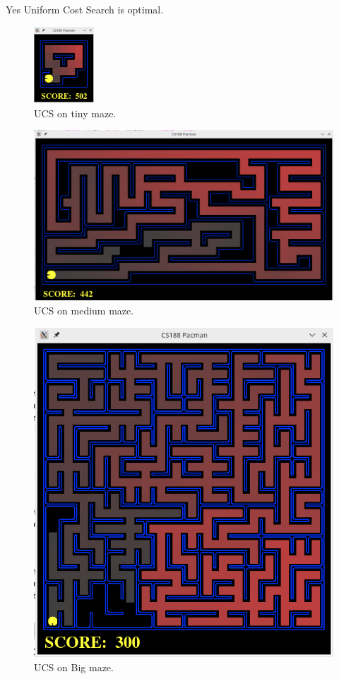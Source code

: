 \documentclass[
10pt, %
a4paper, %
oneside, %
headinclude,footinclude, %
BCOR5mm, %
]{scrartcl}
\begin{document}
\subsection*{}
Yes Uniform Cost Search is optimal.


\begin{figure}[h!]
	\centering
	\includegraphics[width=0.20\textwidth]{images/fig_7_tiny_maze_ucs.png}
	\caption{ UCS on tiny maze.}
	\label{fig:fig_7_tiny_maze_ucs}
\end{figure}

\begin{figure}[h!]
	\centering
	\includegraphics[width=.6\textwidth]{images/fig_8_medium_maze_ucs.png}
	\caption{ UCS on medium maze.}
	\label{fig:fig_8_medium_maze_ucs}
\end{figure}


\begin{figure}[h!]
	\centering
	\includegraphics[width=.7\textwidth]{images/fig_9_bigmaze_ucs.png}
	\caption{ UCS on Big maze.}
	\label{fig:fig_9_bigmaze_ucs}
\end{figure}
\end{document}

